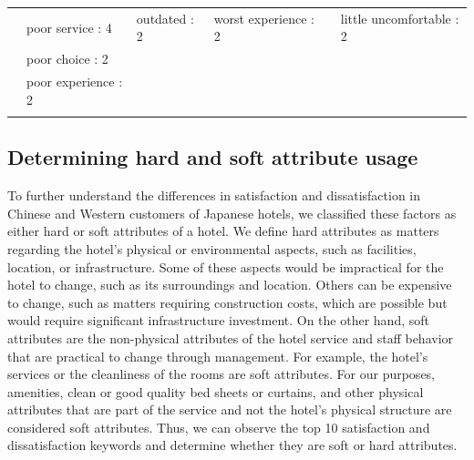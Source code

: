 \documentclass[smallextended,natbib]{svjour3}       %
\begin{document}
\begin{landscape}
\begin{table}[p]
{\begin{tabular}{|c|l|l|l|l|l|}
         &
          poor service : 4 &
          outdated : 2 &
          worst experience : 2 &
           &
          little uncomfortable : 2 \\
         &
          poor choice : 2 &
           &
           &
           &
           \\
         &
          poor experience : 2 &
           &
           &
           &
           \\
         &
           &
           &
           &
           &
           \\ \hline
        \end{tabular}%
        }
    \end{table}
    \end{landscape}

  \subsection{Determining hard and soft attribute usage}\label{det_hard_soft}

    To further understand the differences in satisfaction and dissatisfaction in Chinese and Western customers of Japanese hotels, we classified these factors as either hard or soft attributes of a hotel. We define hard attributes as matters regarding the hotel's physical or environmental aspects, such as facilities, location, or infrastructure. Some of these aspects would be impractical for the hotel to change, such as its surroundings and location. Others can be expensive to change, such as matters requiring construction costs, which are possible but would require significant infrastructure investment. On the other hand, soft attributes are the non-physical attributes of the hotel service and staff behavior that are practical to change through management. For example, the hotel's services or the cleanliness of the rooms are soft attributes. For our purposes, amenities, clean or good quality bed sheets or curtains, and other physical attributes that are part of the service and not the hotel's physical structure are considered soft attributes. Thus, we can observe the top 10 satisfaction and dissatisfaction keywords and determine whether they are soft or hard attributes.
\end{document}
